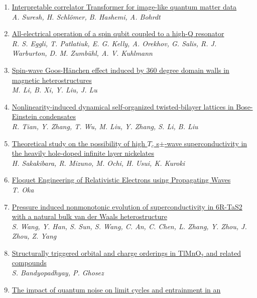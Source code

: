 \documentclass{article}
\begin{document}
\begin{enumerate}
\item\href{http://arxiv.org/abs/2407.21502v1}{\textsf{Interpretable correlator Transformer for image-like quantum matter data}}\\
{\small\color{blue}\textsl{A. Suresh, H. Schlömer, B. Hashemi, A. Bohrdt}}
\item\href{http://arxiv.org/abs/2407.21484v1}{\textsf{All-electrical operation of a spin qubit coupled to a high-Q resonator}}\\
{\small\color{blue}\textsl{R. S. Eggli, T. Patlatiuk, E. G. Kelly, A. Orekhov, G. Salis, R. J. Warburton, D. M. Zumbühl, A. V. Kuhlmann}}
\item\href{http://arxiv.org/abs/2407.21477v1}{\textsf{Spin-wave Goos-Hänchen effect induced by 360 degree domain walls in
  magnetic heterostructures}}\\
{\small\color{blue}\textsl{M. Li, B. Xi, Y. Liu, J. Lu}}
\item\href{http://arxiv.org/abs/2407.21466v1}{\textsf{Nonlinearity-induced dynamical self-organized twisted-bilayer lattices
  in Bose-Einstein condensates}}\\
{\small\color{blue}\textsl{R. Tian, Y. Zhang, T. Wu, M. Liu, Y. Zhang, S. Li, B. Liu}}
\item\href{http://arxiv.org/abs/2407.21461v1}{\textsf{Theoretical study on the possibility of high $T_c$ s$\pm$-wave
  superconductivity in the heavily hole-doped infinite layer nickelates}}\\
{\small\color{blue}\textsl{H. Sakakibara, R. Mizuno, M. Ochi, H. Usui, K. Kuroki}}
\item\href{http://arxiv.org/abs/2407.21458v1}{\textsf{Floquet Engineering of Relativistic Electrons using Propagating Waves}}\\
{\small\color{blue}\textsl{T. Oka}}
\item\href{http://arxiv.org/abs/2407.21427v1}{\textsf{Pressure induced nonmonotonic evolution of superconductivity in 6R-TaS2
  with a natural bulk van der Waals heterostructure}}\\
{\small\color{blue}\textsl{S. Wang, Y. Han, S. Sun, S. Wang, C. An, C. Chen, L. Zhang, Y. Zhou, J. Zhou, Z. Yang}}
\item\href{http://arxiv.org/abs/2407.21406v1}{\textsf{Structurally triggered orbital and charge orderings in TlMnO$_3$ and
  related compounds}}\\
{\small\color{blue}\textsl{S. Bandyopadhyay, P. Ghosez}}
\item\href{http://arxiv.org/abs/2407.21390v1}{\textsf{The impact of quantum noise on limit cycles and entrainment in an
}}
\end{enumerate}
\end{document}
